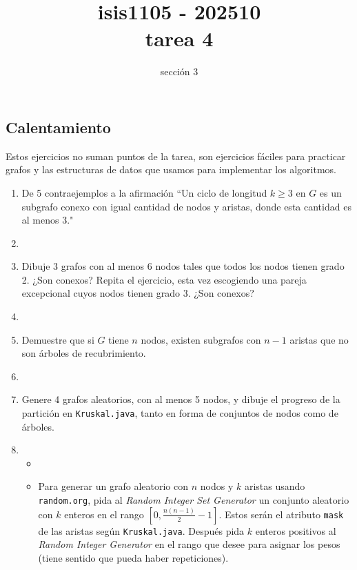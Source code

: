 \documentclass{amsart}
\title{isis1105 - 202510 \\ tarea 4}
\author{sección 3}
\begin{document}
\maketitle

\begin{large}

\section*{Calentamiento} Estos ejercicios no suman puntos de la tarea, son ejercicios fáciles para practicar grafos y las estructuras de datos que usamos para implementar los algoritmos.

\begin{enumerate}
    \item De 5 contraejemplos a la afirmación ``Un ciclo de longitud $k\geq 3$ en $G$ es un subgrafo conexo con igual cantidad de nodos y aristas, donde esta cantidad es al menos 3."
    \item[] 
    \item Dibuje 3 grafos con al menos 6 nodos tales que todos los nodos tienen grado 2. ¿Son conexos? Repita el ejercicio, esta vez escogiendo una pareja excepcional cuyos nodos tienen grado 3. ¿Son conexos?
    \item[] 
    \item Demuestre que si $G$ tiene $n$ nodos, existen subgrafos con $n-1$ aristas que no son árboles de recubrimiento.
    \item[] 
    \item Genere 4 grafos aleatorios, con al menos 5 nodos, y dibuje el progreso de la partición en \texttt{Kruskal.java}, tanto en forma de conjuntos de nodos como de árboles.
    \item[] \begin{itemize}
        \item[]
        \item[] Para generar un grafo aleatorio con  $n$ nodos y $k$ aristas usando \texttt{random.org}, pida al \emph{Random Integer Set Generator} un conjunto aleatorio con $k$ enteros en el rango $[0, \frac{n(n-1)}{2}-1]$. Estos serán el atributo \texttt{mask} de las aristas según \texttt{Kruskal.java}. Después pida $k$ enteros positivos al \emph{Random Integer Generator} en el rango que desee para asignar los pesos (tiene sentido que pueda haber repeticiones).
    \end{itemize} 
\end{enumerate}

\bigskip


\end{large}
\end{document}
